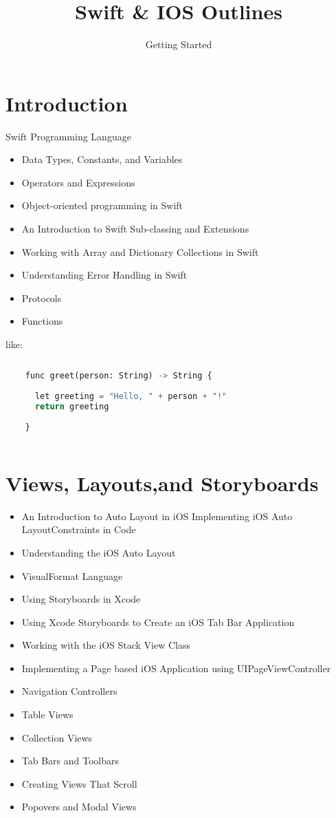\documentclass[14pt]{extarticle}
\title{Swift \& IOS Outlines}
\author{Getting Started}
\date{}
\begin{document}
	
	\setlength{\baselineskip}{25 pt}


    \maketitle 
    \newpage
	
	\tableofcontents
	\newpage
\section{Introduction}
Swift Programming Language

\begin{itemize}
	\item Data Types, Constants, and Variables
	\item Operators and Expressions
	\item Object-oriented programming in Swift
	\item An Introduction to Swift Sub-classing and Extensions
	\item Working with Array and Dictionary Collections in Swift
	\item Understanding Error Handling in Swift
	\item Protocols
	\item Functions
\end{itemize}

like:
\begin{lstlisting}[language=python]
	
	func greet(person: String) -> String { 
		
 	  let greeting = "Hello, " + person + "!"
	  return greeting
	
	}
	
\end{lstlisting}

	
\section{Views, Layouts,and Storyboards}
\begin{itemize}
	\item An Introduction to Auto Layout in iOS Implementing iOS Auto LayoutConstraints in Code
	\item Understanding the iOS Auto Layout
	\item VisualFormat Language
	\item Using Storyboards in Xcode
	\item Using Xcode Storyboards to Create an iOS Tab Bar Application
	\item Working with the iOS Stack View Class
	\item Implementing a Page based iOS Application using UIPageViewController
	\item Navigation Controllers
	\item Table Views
	\item Collection Views
	\item Tab Bars and Toolbars
	\item Creating Views That Scroll
	\item Popovers and Modal Views
\end{itemize}
\end{document}
